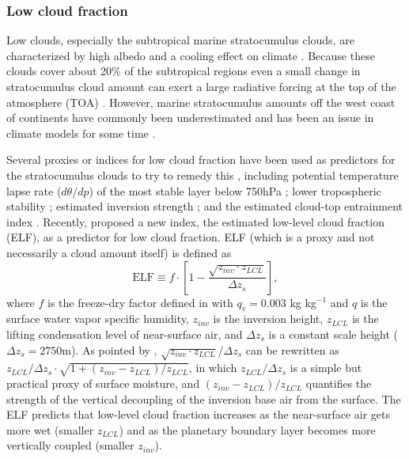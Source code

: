 \subsubsection{Low cloud fraction}
\label{sec:marine_low_cld_scheme}

Low clouds, especially the subtropical marine stratocumulus clouds, are characterized by high albedo and a cooling effect on climate \citep{Hartmann2016}. Because these clouds cover about 20\% of the subtropical regions even a small change in stratocumulus cloud amount can exert a large radiative forcing at the top of the atmosphere (TOA) \citep{Slingo1990}. However, marine stratocumulus amounts off the west coast of continents have commonly been underestimated and has been an issue in climate models for some time \citep[e.g.,][]{Nam2012, Lauer2013, Dolinar2015}.

Several proxies or indices for low cloud fraction have been used as predictors for the stratocumulus clouds to try to remedy this \citep[e.g.,][]{Kawai2006, Joshi2015, Collins2004, Guo2014, Kawai2019}, including potential temperature lapse rate ($d\theta/dp$) of the most stable layer below 750hPa \citep{Slingo1987}; lower tropospheric stability \citep[LTS;][]{Klein1993}; estimated inversion strength \citep[EIS;][]{Wood2006}; and the estimated cloud-top entrainment index \citep[ECTEI;][]{Kawai2017}. Recently, \citet{Park2019} proposed a new index, the estimated low-level cloud fraction (ELF), as a predictor for low cloud fraction. ELF (which is a proxy and not necessarily a cloud amount itself) is defined as
\begin{equation}
	\text{ELF} \equiv f \cdot\left[1-\frac{\sqrt{z_{inv} \cdot z_{LCL}}}{\Delta z_{s}}\right],
	\label{eq:ELF}
\end{equation}
where $f$ is the freeze-dry factor defined in  with $q_v=0.003$ kg kg$^{-1}$ and $q$ is the surface water vapor specific humidity,  $z_{inv}$ is the inversion height, $z_{LCL}$ is the lifting condensation level of near-surface air, and $\Delta z_{s}$ is a constant scale height ($\Delta z_{s}= 2750$m). As pointed by \citet{Park2019},
$\sqrt{z_{inv} \cdot z_{LCL}}/\Delta z_{s}$ can be rewritten as $z_{LCL}/\Delta z_{s}\cdot \sqrt{1+(z_{inv} -z_{LCL})/z_{LCL}}$, in which $z_{LCL}/\Delta z_{s}$ is a simple but practical proxy of surface moisture, and $(z_{inv}-z_{LCL})/z_{LCL}$ quantifies the strength of the vertical decoupling of the inversion base air from the surface. The ELF predicts that low-level cloud fraction increases as the near-surface air gets more wet (smaller $z_{LCL}$) and as the planetary boundary layer becomes more vertically coupled (smaller $z_{inv}$).

